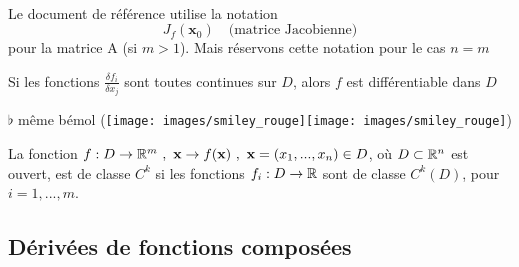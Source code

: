 \documentclass[12pt,a4paper]{article}
\begin{document}
\begin{boite}
\\
Le document de référence utilise la notation 
\begin{equation*}
	J_f(\textbf{x}_0) \quad \text{(matrice Jacobienne)}
\end{equation*}
pour la matrice A (si $m > 1$). Mais réservons cette notation pour le cas $n = m$
\end{boite}
\begin{boite}
	Si les fonctions $\frac{\delta f_i}{\delta x_j}$ sont toutes continues sur $D$, alors $f$ est différentiable dans $D$
\end{boite}
$\flat$ même bémol (\texttt{[image: images/smiley\_rouge]}\texttt{[image: images/smiley\_rouge]})
\begin{boite}
	  La fonction $f:D \to \mathbb{R}^m\ , \ \textbf{x}\to f(\textbf{x})\ , \ \textbf{x}=(x_1,...,x_n) \in D$, où $D \subset \mathbb{R}^n$ est ouvert, est de classe $C^k$ si les fonctions $f_i : D\to \mathbb{R}$ sont de classe $C^k(D)$, pour $i=1,...,m$.
\end{boite}

\subsection{Dérivées de fonctions composées}
\end{document}
